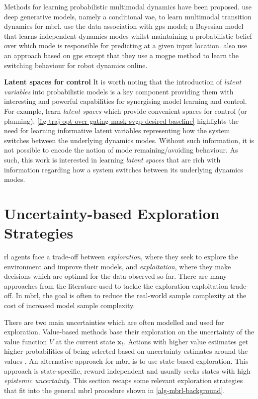 \documentclass{mimosis-class/mimosis}
\numberwithin{equation}{chapter}
\newcommand{\state}{\ensuremath{\mathbf{x}}}
\begin{document}
Methods for learning probabilistic multimodal dynamics have been proposed.
\cite{moerlandLearning2017} use deep generative models, namely a conditional \acrfull{vae},
to learn multimodal transition dynamics for \acrshort{mbrl}.
\cite{kaiserBayesian2020} use the data association with \acrshort{gps} model;
a Bayesian model that learns independent dynamics modes whilst maintaining a
probabilistic belief over which mode is responsible for predicting at a given input location.
\cite{mckinnonLearning2017} also use an approach based on \acrshort{gps} except that they use a
\acrfull{mogpe} method to learn the switching behaviour for robot dynamics online.

\textbf{Latent spaces for control}
It is worth noting that the introduction of \emph{latent variables} into probabilistic models
is a key component providing them with interesting and powerful capabilities for synergising model learning and control.
For example, \cite{hafnerLearning2019,rybkinModelBased2021} learn \emph{latent spaces} which provide
convenient spaces for control (or planning).
\cref{fig-traj-opt-over-gating-mask-svgp-desired-baseline} highlights the need for learning
informative latent variables representing how the system switches between the underlying dynamics modes.
Without such information, it is not possible to encode the notion of mode remaining/avoiding behaviour.
As such, this work is interested in learning \emph{latent spaces}
that are rich with information regarding how a system switches between its underlying dynamics modes.

\section{Uncertainty-based Exploration Strategies \label{sec-unc-exploration}}
\label{sec:org1f3782c}
\acrfull{rl} agents face a trade-off between \emph{exploration}, where they seek to explore the environment and improve
their models, and \emph{exploitation}, where they make decisions which are optimal for the data observed so far.
There are many approaches from the literature used to tackle the exploration-exploitation trade-off.
In \acrshort{mbrl}, the goal is often to reduce the real-world sample complexity at the cost of increased
model sample complexity.

There are two main uncertainties which are often modelled and used for exploration.
Value-based methods base their exploration on the uncertainty of the value function \(V\) at the current state \(\state_t\).
Actions with higher value estimates get higher probabilities of being selected based on
uncertainty estimates around the values \citep{moerlandEfficient2017,auerUsing2002}.
An alternative approach for \acrshort{mbrl} is to use state-based exploration.
This approach is state-specific, reward independent and usually seeks states with high \emph{epistemic uncertainty}.
This section recaps some relevant exploration strategies that fit into the general
\acrshort{mbrl} procedure shown in \cref{alg-mbrl-background}.
\end{document}
